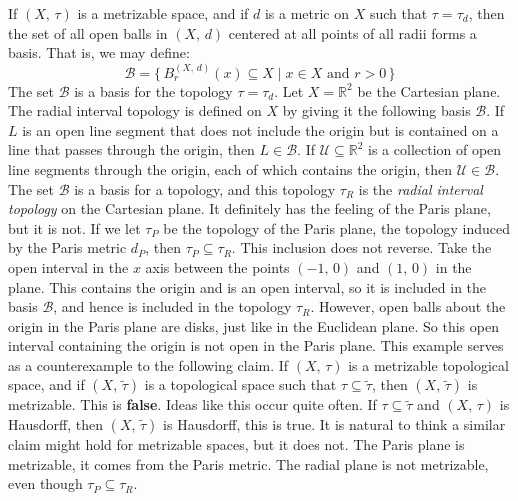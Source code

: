 \documentclass{article}
\theoremstyle{plain}
\theoremstyle{normal}
\newenvironment{example}{%
    \pushQED{\qed}\renewcommand{\qedsymbol}{$\blacksquare$}\examplex%
}{%
    \popQED\endexamplex%
}
\begin{document}
        \begin{example}
            If $(X,\,\tau)$ is a metrizable space, and if $d$ is a metric on
            $X$ such that $\tau=\tau_{d}$, then the set of all open balls
            in $(X,\,d)$ centered at all points of all radii forms a basis.
            That is, we may define:
            \begin{equation}
                \mathcal{B}=\{\,B_{r}^{(X,\,d)}(x)\subseteq{X}\;|\;
                    x\in{X}\textrm{ and }r>0\,\}
            \end{equation}
            The set $\mathcal{B}$ is a basis for the topology
            $\tau=\tau_{d}$.
        \end{example}
        \begin{example}[\textbf{The Radial Interval Topology}]
            Let $X=\mathbb{R}^{2}$ be the Cartesian plane. The radial interval
            topology is defined on $X$ by giving it the following basis
            $\mathcal{B}$. If $L$ is an open line segment that does not include
            the origin but is contained on a line that passes through the
            origin, then $L\in\mathcal{B}$. If
            $\mathcal{U}\subseteq\mathbb{R}^{2}$ is a collection of open
            line segments through the origin, each of which contains the
            origin, then $\mathcal{U}\in\mathcal{B}$. The set
            $\mathcal{B}$ is a basis for a topology, and this topology
            $\tau_{R}$ is the \textit{radial interval topology} on the
            Cartesian plane. It definitely has the feeling of the Paris plane,
            but it is not. If we let $\tau_{P}$ be the topology of the Paris
            plane, the topology induced by the Paris metric $d_{P}$, then
            $\tau_{P}\subseteq\tau_{R}$. This inclusion does not reverse.
            Take the open interval in the $x$ axis between the points
            $(-1,\,0)$ and $(1,\,0)$ in the plane. This contains the origin and
            is an open interval, so it is included in the basis $\mathcal{B}$,
            and hence is included in the topology $\tau_{R}$. However, open
            balls about the origin
            in the Paris plane are disks, just like in the Euclidean plane.
            So this open interval containing the origin is not open in the
            Paris plane. This example serves as a counterexample to the
            following claim. If $(X,\,\tau)$ is a metrizable topological space,
            and if $(X,\,\tilde{\tau})$ is a topological space such that
            $\tau\subseteq\tilde{\tau}$, then $(X,\,\tilde{\tau})$ is
            metrizable. This is \textbf{false}. Ideas like this occur quite
            often. If $\tau\subseteq\tilde{\tau}$ and $(X,\,\tau)$ is Hausdorff,
            then $(X,\,\tilde{\tau})$ is Hausdorff, this is true. It is
            natural to think a similar claim might hold for metrizable spaces,
            but it does not. The Paris plane is metrizable, it comes from the
            Paris metric. The radial plane is not metrizable, even though
            $\tau_{P}\subseteq\tau_{R}$.
        \end{example}
\end{document}
